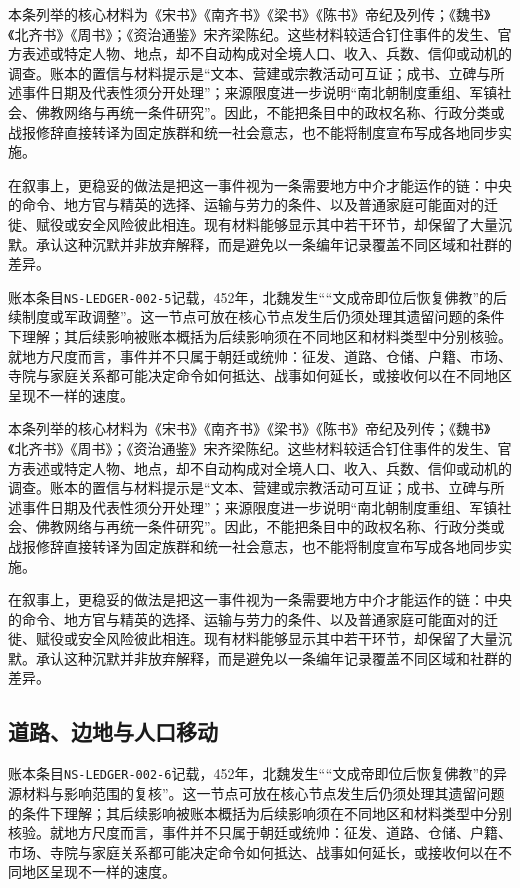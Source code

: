 本条列举的核心材料为《宋书》《南齐书》《梁书》《陈书》帝纪及列传；《魏书》《北齐书》《周书》；《资治通鉴》宋齐梁陈纪。这些材料较适合钉住事件的发生、官方表述或特定人物、地点，却不自动构成对全境人口、收入、兵数、信仰或动机的调查。账本的置信与材料提示是“文本、营建或宗教活动可互证；成书、立碑与所述事件日期及代表性须分开处理”；来源限度进一步说明“南北朝制度重组、军镇社会、佛教网络与再统一条件研究”。因此，不能把条目中的政权名称、行政分类或战报修辞直接转译为固定族群和统一社会意志，也不能将制度宣布写成各地同步实施。

在叙事上，更稳妥的做法是把这一事件视为一条需要地方中介才能运作的链：中央的命令、地方官与精英的选择、运输与劳力的条件、以及普通家庭可能面对的迁徙、赋役或安全风险彼此相连。现有材料能够显示其中若干环节，却保留了大量沉默。承认这种沉默并非放弃解释，而是避免以一条编年记录覆盖不同区域和社群的差异。

账本条目\texttt{NS-LEDGER-002-5}记载，452年，北魏发生““文成帝即位后恢复佛教”的后续制度或军政调整”。这一节点可放在核心节点发生后仍须处理其遗留问题的条件下理解；其后续影响被账本概括为后续影响须在不同地区和材料类型中分别核验。就地方尺度而言，事件并不只属于朝廷或统帅：征发、道路、仓储、户籍、市场、寺院与家庭关系都可能决定命令如何抵达、战事如何延长，或接收何以在不同地区呈现不一样的速度。

本条列举的核心材料为《宋书》《南齐书》《梁书》《陈书》帝纪及列传；《魏书》《北齐书》《周书》；《资治通鉴》宋齐梁陈纪。这些材料较适合钉住事件的发生、官方表述或特定人物、地点，却不自动构成对全境人口、收入、兵数、信仰或动机的调查。账本的置信与材料提示是“文本、营建或宗教活动可互证；成书、立碑与所述事件日期及代表性须分开处理”；来源限度进一步说明“南北朝制度重组、军镇社会、佛教网络与再统一条件研究”。因此，不能把条目中的政权名称、行政分类或战报修辞直接转译为固定族群和统一社会意志，也不能将制度宣布写成各地同步实施。

在叙事上，更稳妥的做法是把这一事件视为一条需要地方中介才能运作的链：中央的命令、地方官与精英的选择、运输与劳力的条件、以及普通家庭可能面对的迁徙、赋役或安全风险彼此相连。现有材料能够显示其中若干环节，却保留了大量沉默。承认这种沉默并非放弃解释，而是避免以一条编年记录覆盖不同区域和社群的差异。

\subsection{道路、边地与人口移动}

账本条目\texttt{NS-LEDGER-002-6}记载，452年，北魏发生““文成帝即位后恢复佛教”的异源材料与影响范围的复核”。这一节点可放在核心节点发生后仍须处理其遗留问题的条件下理解；其后续影响被账本概括为后续影响须在不同地区和材料类型中分别核验。就地方尺度而言，事件并不只属于朝廷或统帅：征发、道路、仓储、户籍、市场、寺院与家庭关系都可能决定命令如何抵达、战事如何延长，或接收何以在不同地区呈现不一样的速度。


